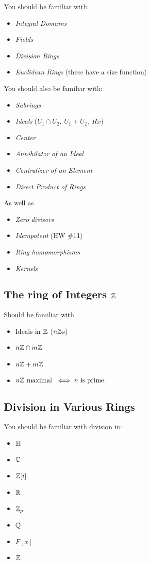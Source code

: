 You should be familiar with:
\begin{itemize}
    \item \textit{Integral Domains}
    \item \textit{Fields}
    \item \textit{Division Rings}
    \item \textit{Euclidean Rings} (these have a size function)
\end{itemize}
You should also be familiar with:
\begin{itemize}
    \item\textit{Subrings}
    \item \textit{Ideals} ($U_1\cap U_2, \ U_1+U_2, \ Rx$)
    \item \textit{Center}
    \item \textit{Annihilator of an Ideal}
    \item \textit{Centralizer of an Element}
    \item \textit{Direct Product of Rings}
\end{itemize}
As well as
\begin{itemize}
    \item \textit{Zero divisors}
    \item \textit{Idempotent} (HW \#11)
    \item \textit{Ring homomorphisms}
    \item \textit{Kernels}
\end{itemize}
\subsection*{The ring of Integers ${\mathbb{Z}}$}
Should be familiar with
\begin{itemize}
    \item Ideals in ${\mathbb{Z}}$ ($n{\mathbb{Z}}$s)
    \item $n{\mathbb{Z}}\cap m{\mathbb{Z}}$
    \item $n{\mathbb{Z}}+m{\mathbb{Z}}$
    \item $n{\mathbb{Z}} \text{ maximal }\iff n \text{ is prime.}$
\end{itemize}
\subsection*{Division in Various Rings}
You should be familiar with division in:
\begin{itemize}
    \item ${\mathbb{H}}$
    \item ${\mathbb{C}}$
    \item ${\mathbb{Z}}[i]$
    \item ${\mathbb{R}}$
    \item ${\mathbb{Z}}_p$
    \item ${\mathbb{Q}}$
    \item $F[x]$
    \item ${\mathbb{Z}}$
\end{itemize}
